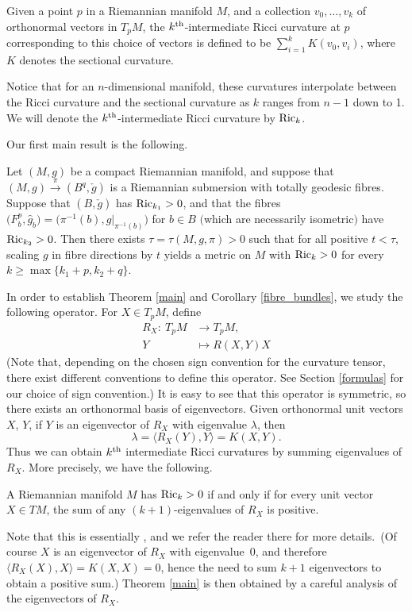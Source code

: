 \setcounter{section}{1}
\begin{Definition}
	Given a point $p$ in a Riemannian manifold $M$, and a collection $v_0,\dots,v_k$ of orthonormal vectors in $T_pM$, the $k^{\rm th}$-intermediate Ricci curvature at $p$ corresponding to this choice of vectors is defined to be $\sum_{i=1}^k K(v_0,v_i)$, where $K$ denotes the sectional curvature.
\end{Definition}
Notice that for an $n$-dimensional manifold, these curvatures interpolate between the Ricci curvature and the sectional curvature as $k$ ranges from $n-1$ down to 1. We will denote the $k^{\rm th}$-intermediate Ricci curvature by ${\rm Ric}_k$.

Our first main result is the following.

\begin{TheoremAlph}\label{main}
	Let $(M,g)$ be a compact Riemannian manifold, and suppose that $(M,g)\xrightarrow{\pi} (B^q,\check{g})$ is a Riemannian submersion with totally geodesic fibres. Suppose that $(B,\check{g})$ has ${\rm Ric}_{k_1}>0$, and that the fibres $\bigl(F_b^p,\hat{g}_b\bigr)=\bigl(\pi^{-1}(b),g|_{\pi^{-1}(b)}\bigr)$ for $b \in B$ $($which are necessarily isometric$)$ have ${\rm Ric}_{k_2}>0$. Then there exists $\tau=\tau(M,g,\pi)>0$ such that for all positive $t<\tau$, scaling $g$ in fibre directions by $t$ yields a metric on $M$ with ${\rm Ric}_k>0$ for every $k\ge \max\{k_1+p,k_2+q\}$.	
\end{TheoremAlph}


In order to establish Theorem \ref{main} and Corollary \ref{fibre_bundles}, we study the following operator. For $X \in T_pM$, define
\begin{align*}
	R_X\colon \ T_pM &\to T_pM, \\
	Y &\mapsto R(X,Y)X
\end{align*}
(Note that, depending on the chosen sign convention for the curvature tensor, there exist different conventions to define this operator. See Section \ref{formulas} for our choice of sign convention.)
It is easy to see that this operator is symmetric, so there exists an orthonormal basis of eigenvectors. Given orthonormal unit vectors $X$, $Y$, if $Y$ is an eigenvector of $R_X$ with eigenvalue $\lambda$, then \[\lambda=\langle R_X(Y),Y\rangle=K(X,Y).\] Thus we can obtain $k^{\rm th}$ intermediate Ricci curvatures by summing eigenvalues of $R_X$. More precisely, we have the following.
\begin{Lemma}\label{k+1}
	A Riemannian manifold $M$ has ${\rm Ric}_k>0$ if and only if for every unit vector $X \in TM$, the sum of any $(k+1)$-eigenvalues of $R_X$ is positive.
\end{Lemma}
Note that this is essentially \cite[Lemma 2.6]{RW}, and we refer the reader there for more details.~(Of course $X$ is an eigenvector of $R_X$ with eigenvalue~0, and therefore $\langle R_X(X),X\rangle =K(X,X)=0$, hence the need to sum $k+1$ eigenvectors to obtain a positive sum.) Theorem \ref{main} is then obtained by a careful analysis of the eigenvectors of $R_X$.


